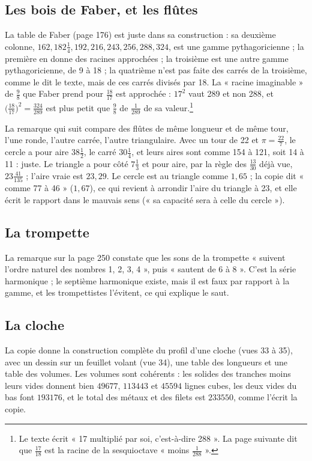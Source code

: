 \documentclass[11pt,a4paper]{article}
\begin{document}
\subsection*{Les bois de Faber, et les flûtes}

La table de Faber (page 176) est juste dans sa construction : sa deuxième
colonne, $162, 182\frac14, 192, 216, 243, 256, 288, 324$, est une gamme
pythagoricienne ; la première en donne des racines approchées ; la troisième est
une autre gamme pythagoricienne, de 9 à 18 ; la quatrième n'est pas faite des
carrés de la troisième, comme le dit le texte, mais de ces carrés divisés par 18.
La « racine imaginable » de $\frac98$ que Faber prend pour $\frac{18}{17}$ est
approchée : $17^2$ vaut 289 et non 288, et $\bigl(\frac{18}{17}\bigr)^2 =
\frac{324}{289}$ est plus petit que $\frac98$ de $\frac{1}{289}$ de sa
valeur.\footnote{Le texte écrit « 17 multiplié par soi, c'est-à-dire 288 ». La
page suivante dit que $\frac{17}{18}$ est la racine de la sesquioctave « moins
$\frac{1}{288}$ ».}

La remarque qui suit compare des flûtes de même longueur et de même tour, l'une
ronde, l'autre carrée, l'autre triangulaire. Avec un tour de 22 et
$\pi = \frac{22}{7}$, le cercle a pour aire $38\frac12$, le carré $30\frac14$,
et leurs aires sont comme 154 à 121, soit 14 à 11 : juste. Le triangle a pour
côté $7\frac13$ et pour aire, par la règle des $\frac{13}{30}$ déjà vue,
$23\frac{41}{135}$ ; l'aire vraie est $23{,}29$. Le cercle est au triangle comme
$1{,}65$ ; la copie dit « comme 77 à 46 » ($1{,}67$), ce qui revient à arrondir
l'aire du triangle à 23, et elle écrit le rapport dans le mauvais sens (« sa
capacité sera à celle du cercle »).

\subsection*{La trompette}

La remarque sur la page 250 constate que les sons de la trompette « suivent
l'ordre naturel des nombres 1, 2, 3, 4 », puis « sautent de 6 à 8 ». C'est la
série harmonique ; le septième harmonique existe, mais il est faux par rapport
à la gamme, et les trompettistes l'évitent, ce qui explique le saut.

\subsection*{La cloche}

La copie donne la construction complète du profil d'une cloche (vues 33 à 35),
avec un dessin sur un feuillet volant (vue 34), une table des longueurs et une
table des volumes. Les volumes sont cohérents : les solides des tranches moins
leurs vides donnent bien $49677$, $113443$ et $45594$ lignes cubes, les deux vides
du bas font $193176$, et le total des métaux et des filets est $233550$, comme
l'écrit la copie.
\end{document}
